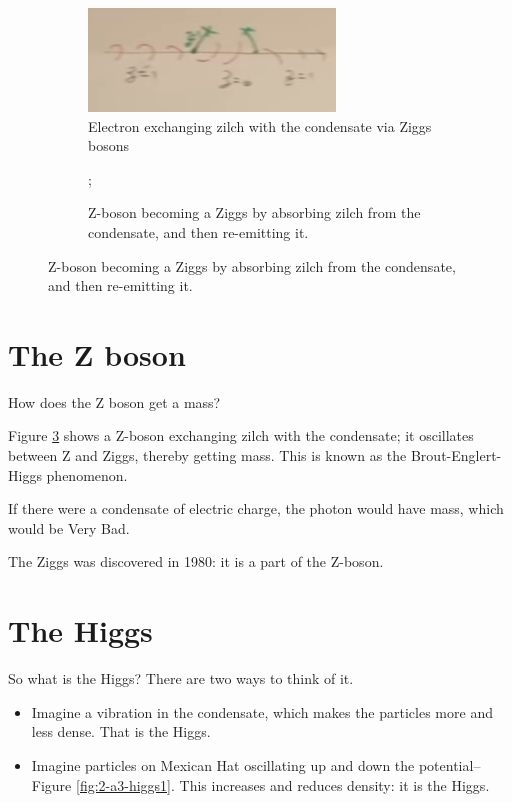 \documentclass[]{article}
\begin{document}
\begin{figure}[H]
	\caption{Spontaneous breaking of chiral symmetry}
	\begin{subfigure}[t]{0.4\textwidth}
		\caption{Electron exchanging zilch with the condensate via Ziggs bosons}\label{fig:2-a3-zilch}
		\includegraphics[width=\textwidth]{2-a3-zilch}
	\end{subfigure}
	\hfill
	\begin{subfigure}[t]{0.4\textwidth}
		\caption{Z-boson becoming a Ziggs by absorbing zilch from the condensate, and then re-emitting it.}\label{fig:2-a3-zilch-Z}
		;
	\end{subfigure}
\end{figure}

\section{The Z boson}

How does the Z boson get a mass?

Figure \ref{fig:2-a3-zilch-Z} shows a Z-boson exchanging zilch with the condensate; it oscillates between Z and Ziggs, thereby getting mass. This is known as the Brout-Englert-Higgs phenomenon.

If there were a condensate of electric charge, the photon would have mass, which would be Very Bad.

The Ziggs was discovered in 1980: it is a part of the Z-boson.

\section{The Higgs}

So what is the Higgs? There are two ways to think of it.
\begin{itemize}
	\item Imagine a vibration in the condensate, which makes the particles more and less dense. That is the Higgs.
	\item Imagine particles on Mexican Hat oscillating up and down the potential--Figure \ref{fig:2-a3-higgs1}. This increases and reduces density: it is the Higgs.
\end{itemize}
\end{document}

